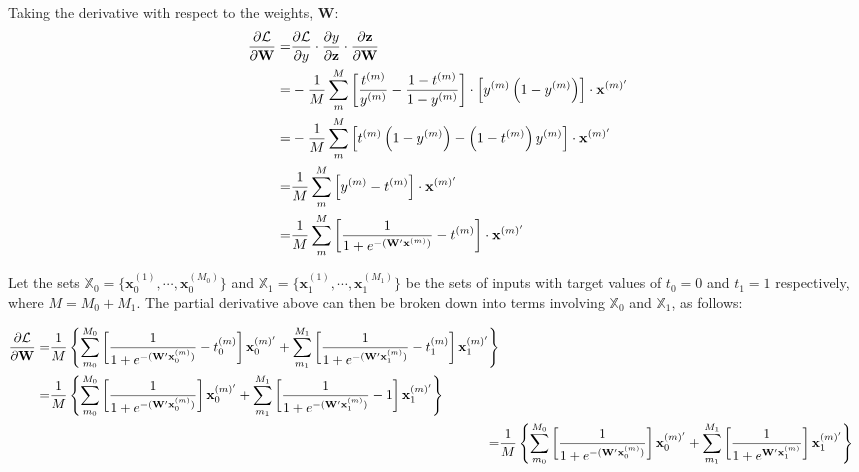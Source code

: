 \documentclass[a4paper,12pt]{article}
\begin{document}
Taking the derivative with respect to the weights, $\mathbf{W}$:
\begin{align}
\begin{split}
\pdv{\mathcal{L}}{\mathbf{W}} =& \pdv{\mathcal{L}}{y} \cdot \pdv{y}{\mathbf{z}} \cdot 
	\pdv{\mathbf{z}}{\mathbf{W}} \\
=& - \frac{1}{M} \sum_m^M \left[ \frac{t^{(m)}}{y^{(m)}} -
	\frac{1 - t^{(m)}}{1 - y^{(m)}} \right] \cdot 
    \left[ y^{(m)} \left(1 - y^{(m)} \right) \right] \cdot
    \mathbf{x}^{(m)'} \\
=& - \frac{1}{M} \sum_m^M \left[ t^{(m)} \left( 1 - y^{(m)} \right) -
	\left( 1 - t^{(m)} \right) y^{(m)} \right] \cdot 
    \mathbf{x}^{(m)'} \\
=& \frac{1}{M} \sum_m^M \left[ y^{(m)} - t^{(m)} \right] \cdot 
    \mathbf{x}^{(m)'} \\
=& \frac{1}{M} \sum_m^M \left[ \frac{1}{1 + e^{- (\mathbf{W'x}^{(m)}) }} 
	- t^{(m)} \right] \cdot \mathbf{x}^{(m)'} \\
\end{split}
\end{align}

Let the sets $\mathbb{X}_0 = \{\mathbf{x}_0^{(1)}, \cdots, \mathbf{x}_0^{(M_0)} \}$ and $\mathbb{X}_1 = \{\mathbf{x}_1^{(1)}, \cdots, \mathbf{x}_1^{(M_1)} \}$ be the sets of inputs with target values of $t_0 = 0$ and $t_1 = 1$ respectively, where $M = M_0 + M_1$. The partial derivative above can  then be broken down into terms involving $\mathbb{X}_0$ and $\mathbb{X}_1$, as follows:

\begin{align}
\begin{split}
\pdv{\mathcal{L}}{\mathbf{W}} =& \frac{1}{M}  \left\{ \sum_{m_0}^{M_0} \left[ \frac{1}{1 + e^{- 
	(\mathbf{W'x}_0^{(m)}) }} - t_0^{(m)} \right] \mathbf{x}_0^{(m)'} +
    \sum_{m_1}^{M_1} \left[ \frac{1}{1 + e^{- (\mathbf{W'x}_1^{(m)}) }} - t_1^{(m)} \right] 
    \mathbf{x}_1^{(m)'} \right\} \\
=& \frac{1}{M}  \left\{ \sum_{m_0}^{M_0} \left[ \frac{1}{1 + e^{- 
	(\mathbf{W'x}_0^{(m)}) }} \right] \mathbf{x}_0^{(m)'} +
    \sum_{m_1}^{M_1} \left[ \frac{1}{1 + e^{- (\mathbf{W'x}_1^{(m)}) }} - 1 \right] 
    \mathbf{x}_1^{(m)'} \right\}
\end{split} \\
\label{equation:SimplifiedGrad}
=& \frac{1}{M}  \left\{ \sum_{m_0}^{M_0} \left[ \frac{1}{1 + e^{- 
	(\mathbf{W'x}_0^{(m)}) }} \right] \mathbf{x}_0^{(m)'} +
    \sum_{m_1}^{M_1} \left[ \frac{1}{1 + e^{\mathbf{W'x}_1^{(m)}}} \right] 
    \mathbf{x}_1^{(m)'} \right\}
\end{align}
\end{document}
